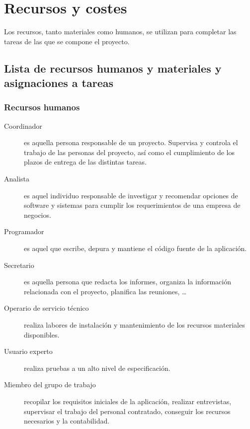 \documentclass[11pt,a4paper,spanish,twoside]{book}
\begin{document}
\chapter{Recursos y costes}
Los recursos, tanto materiales como humanos, se utilizan para completar las
tareas de las que se compone el proyecto.


\section{Lista de recursos humanos y materiales y asignaciones a 
  tareas}

\subsection{Recursos humanos}
\begin{description}
\item[Coordinador] es aquella persona responsable de un proyecto. Supervisa y
  controla el trabajo de las personas del proyecto, así como el cumplimiento
  de los plazos de entrega de las distintas tareas. 

\item[Analista] es aquel individuo responsable de investigar y
  recomendar opciones de software y sistemas para cumplir los requerimientos
  de una empresa de negocios.  

\item[Programador] es aquel que escribe, depura y mantiene el código fuente
  de la aplicación.  

\item[Secretario] es aquella persona que redacta los informes, organiza la
  información relacionada con el proyecto, planifica las reuniones, \dots

\item[Operario de servicio técnico] realiza labores de instalación y
  mantenimiento de los recursos materiales disponibles.

\item[Usuario experto] realiza pruebas a un alto nivel de especificación.

\item[Miembro del grupo de trabajo] recopilar los requisitos iniciales de la
  aplicación, realizar entrevistas, supervisar el trabajo del personal
  contratado, conseguir los recursos necesarios y la contabilidad.

\end{description}
\end{document}
